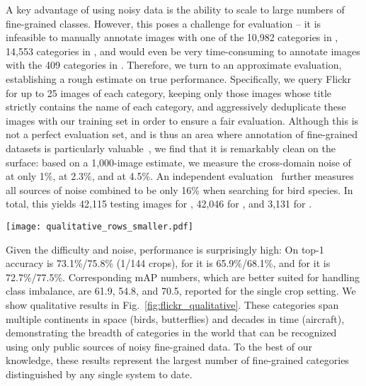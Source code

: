 \documentclass[runningheads]{llncs}
\begin{document}
A key advantage of using noisy data is the ability to scale to large numbers of fine-grained classes.
However, this poses a challenge for evaluation -- it is infeasible to manually annotate images with one of the 10,982 categories in \lbird{}, 14,553 categories in \llep{}, and would even be very time-consuming to annotate images with the 409 categories in \lair{}.
Therefore, we turn to an approximate evaluation, establishing a rough estimate on true performance.
Specifically, we query Flickr for up to 25 images of each category, keeping only those images whose title strictly contains the name of each category, and aggressively deduplicate these images with our training set in order to ensure a fair evaluation.
Although this is not a perfect evaluation set, and is thus an area where annotation of fine-grained datasets is particularly valuable~\cite{horn2015}, we find that it is remarkably clean on the surface:
based on a 1,000-image estimate, we measure the cross-domain noise of \lbird{} at only 1\%, \llep{} at 2.3\%, and \lair{} at 4.5\%.
An independent evaluation~\cite{horn2015} further measures all sources of noise combined to be only 16\% when searching for bird species.
In total, this yields 42,115 testing images for \lbird{}, 42,046 for \llep{}, and 3,131 for \lair{}.

\begin{figure*}[t]
\centering
\texttt{[image: qualitative\_rows\_smaller.pdf]}
\caption{
Classification results on very large-scale fine-grained recognition.
From top to bottom, depicted are examples of categories in \lbird{}, \llep{}, and \lair{}, along with their category name.
The first examples in each row are correctly predicted by our models, while the last two examples in each row are errors, with our prediction in grey and correct category (according to Flickr metadata) printed below.
}
\label{fig:flickr_qualitative}
\end{figure*}


Given the difficulty and noise, performance is surprisingly high:
On \lbird{} top-1 accuracy is 73.1\%/75.8\% (1/144 crops), for \llep{} it is 65.9\%/68.1\%, and for \lair{} it is 72.7\%/77.5\%.
Corresponding mAP numbers, which are better suited for handling class imbalance, are 61.9, 54.8, and 70.5, reported for the single crop setting.
We show qualitative results in Fig.~\ref{fig:flickr_qualitative}.
These categories span multiple continents in space (birds, butterflies) and decades in time (aircraft), demonstrating the breadth of categories in the world that can be recognized using only public sources of noisy fine-grained data.
To the best of our knowledge, these results represent the largest number of fine-grained categories distinguished by any single system to date.
\end{document}
